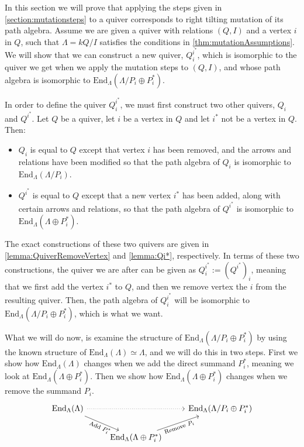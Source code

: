 \documentclass[12pt, dvipsnames, oneside]{amsart}
\theoremstyle{definition}
\newcommand{\End}{\text{End}}
\begin{document}
In this section we will prove that applying the steps given in \cref{section:mutationsteps} to a quiver corresponds to right tilting mutation of its path algebra.
Assume we are given a quiver with relations $(Q,I)$ and a vertex $i$ in $Q$, such that $\Lambda= kQ/I$ satisfies the conditions in \cref{thm:mutationAssumptions}. 
We will show that we can construct a new quiver, $Q_i^{i^*}$, which is isomorphic to the quiver we get when we apply the mutation steps to $(Q,I)$, and whose path algebra is isomorphic to $\End_{\Lambda}(\Lambda/P_i\oplus P_i^*)$.

In order to define the quiver $Q_i^{i^*}$, we must first construct two other quivers, $Q_i$ and $Q^{i^*}$. Let $Q$ be a quiver, let $i$ be a vertex in $Q$ and let $i^*$ not be a vertex in $Q$. Then:
\begin{itemize}
\item $Q_i$ is equal to $Q$ except that vertex $i$ has been removed, and the arrows and relations have been modified so that the path algebra of $Q_i$ is isomorphic to $\End_\Lambda(\Lambda/P_i)$.
\item $Q^{i^*}$ is equal to $Q$ except that a new vertex $i^*$ has been added, along with certain arrows and relations, so that the path algebra of $Q^{i^*}$ is isomorphic to $\End_\Lambda(\Lambda\oplus P_i^*)$.
\end{itemize}

The exact constructions of these two quivers are given in \cref{lemma:QuiverRemoveVertex} and \cref{lemma:Qi*}, respectively.
In terms of these two constructions, the quiver we are after can be given as $Q_i^{i^*}:= (Q^{i^*})_i$, meaning that we first add the vertex $i^*$ to $Q$, and then we remove vertex the $i$ from the resulting quiver. Then, the path algebra of $Q_i^{i^*}$ will be isomorphic to $\End_\Lambda(\Lambda/P_i\oplus P_i^*)$, which is what we want.

What we will do now, is examine the structure of $\End_{\Lambda}(\Lambda/P_i\oplus P_i^*)$ by using the known structure of
$\End_{\Lambda}(\Lambda)\simeq \Lambda$, and we will do this in two steps.
First we show how $\End_\Lambda(\Lambda)$ changes when we add the direct summand $P_i^*$, meaning we look at $\End_{\Lambda}(\Lambda\oplus P_i^*)$. Then we show how $\End_\Lambda(\Lambda\oplus P_i^*)$ changes when we remove the summand $P_i$.
\begin{equation*}
	\begin{tikzcd}
		\End_{\Lambda}(\Lambda) \arrow[rr, dotted] \arrow[dr, "{\text{Add } P_i^*}"', sloped] & & \End_{\Lambda}(\Lambda/P_i\oplus P_i^*) \\
		& \End_{\Lambda}(\Lambda \oplus P_i^*) \arrow[ur, "{\text{Remove } P_i}"', sloped]& 
	\end{tikzcd}
\end{equation*}
\end{document}
